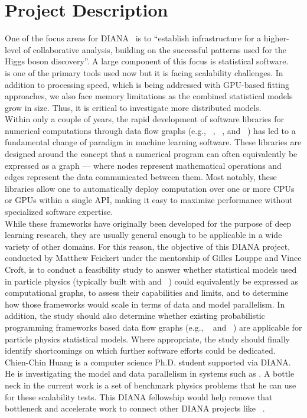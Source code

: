 \section{Project Description}

One of the focus areas for DIANA~\cite{DIANA-proposal-2014} is to ``establish infrastructure for a higher-level of collaborative analysis, building on the successful patterns used for the Higgs boson discovery''.
A large component of this focus is statistical software.
~\cite{Verkerke:2003ir} is one of the primary tools used now but it is facing scalability challenges.
In addition to processing speed, which is being addressed with GPU-based fitting approaches, we also face memory limitations as the combined statistical models grow in size.
Thus, it is critical to investigate more distributed models.\\

Within only a couple of years, the rapid development of software libraries for numerical computations through data flow graphs (e.g., ~\cite{tensorflow2015-whitepaper}, ~\cite{theano-full}, and ~\cite{DBLP:journals/corr/ChenLLLWWXXZZ15}) has led to a fundamental change of paradigm in machine learning software.
These libraries are designed around the concept that a numerical program can often equivalently be expressed as a graph --- where nodes represent mathematical operations and edges represent the data communicated between them.
Most notably, these libraries allow one to automatically deploy computation over one or more CPUs or GPUs within a single API, making it easy to maximize performance without specialized software expertise.\\

While these frameworks have originally been developed for the purpose of deep learning research, they are usually general enough to be applicable in a wide variety of other domains.
For this reason, the objective of this DIANA project, conducted by Matthew Feickert under the mentorship of Gilles Louppe and Vince Croft, is to conduct a feasibility study to answer whether statistical models used in particle physics (typically built with  and ~\cite{Cranmer:2012sba}) could equivalently be expressed as computational graphs, to assess their capabilities and limits, and to determine how those frameworks would scale in terms of data and model parallelism.
In addition, the study should also determine whether existing probabilistic programming frameworks based data flow graphs (e.g., ~\cite{tran2016edward} and ~\cite{tensorprob2016}) are applicable for particle physics statistical models.
Where appropriate, the study should finally identify shortcomings on which further software efforts could be dedicated.\\

Chien-Chin Huang is a computer science Ph.D. student supported via DIANA.
He is investigating the model and data parallelism in systems such as .
A bottle neck in the current work is a set of benchmark physics problems that he can use for these scalability tests.
This DIANA fellowship would help remove that bottleneck and accelerate work to connect other DIANA projects like ~\cite{histogrammar2017}.
